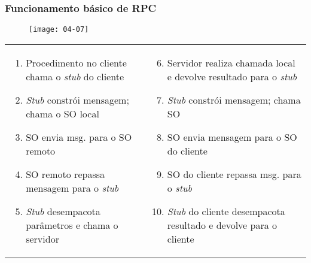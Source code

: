 \documentclass[Ligatures=TeX,table,brazil,svgnames,usetotalslideindicator,compress,10pt]{beamer}
\begin{document}
\begin{frame}
  \frametitle{Funcionamento básico de RPC}

  \begin{figure}
    \centering
    \texttt{[image: 04-07]}
  \end{figure}

  \scriptsize
      \begin{tabular}{@{}ll}
        \begin{minipage}{0.45\textwidth}
          \begin{enumerate}%
          \item Procedimento no cliente chama o \textit{stub} do cliente
          \item \textit{Stub} constrói mensagem; chama o SO local
          \item SO envia msg. para o SO remoto
          \item SO remoto repassa mensagem para o \textit{stub}
          \item \textit{Stub} desempacota parâmetros e chama o servidor
          \end{enumerate}
        \end{minipage} &

        \begin{minipage}{0.45\textwidth}
          \begin{enumerate}
            \setcounter{enumi}{5}
          \item Servidor realiza chamada local e devolve resultado para o \textit{stub}
          \item \textit{Stub} constrói mensagem; chama SO
          \item SO envia mensagem para o SO do cliente
          \item SO do cliente repassa msg. para o \textit{stub}
          \item \textit{Stub} do cliente desempacota resultado e devolve para o cliente
          \end{enumerate}
        \end{minipage}
      \end{tabular}
\end{frame}
\end{document}
